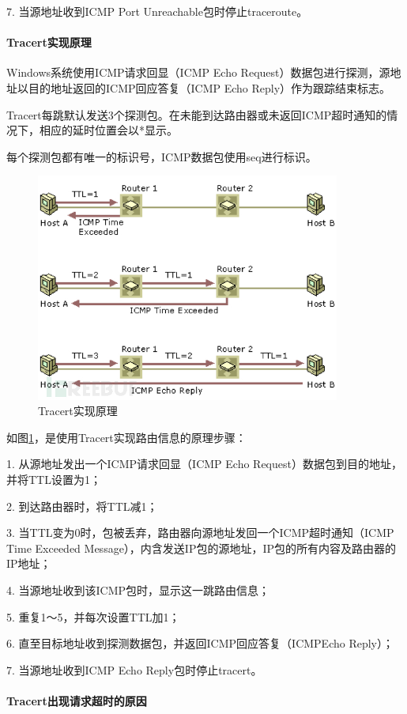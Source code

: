 \documentclass[a4paper,12pt]{report}
\begin{document}
\begin{spacing}{1.5}
7. 当源地址收到ICMP Port Unreachable包时停止traceroute。

\paragraph*{Tracert实现原理}

Windows系统使用ICMP请求回显（ICMP Echo Request）数据包进行探测，源地址以目的地址返回的ICMP回应答复（ICMP Echo Reply）作为跟踪结束标志。

Tracert每跳默认发送3个探测包。在未能到达路由器或未返回ICMP超时通知的情况下，相应的延时位置会以*显示。

每个探测包都有唯一的标识号，ICMP数据包使用seq进行标识。

\begin{figure}[htb!]
  \centering
\includegraphics[width=10cm]{figure/tracert-why.jpeg}
\caption{Tracert实现原理}
\label{pic:tracert}
\end{figure}


如图\ref{pic:tracert}，是使用Tracert实现路由信息的原理步骤：

1. 从源地址发出一个ICMP请求回显（ICMP Echo Request）数据包到目的地址，并将TTL设置为1；

2. 到达路由器时，将TTL减1；

3. 当TTL变为0时，包被丢弃，路由器向源地址发回一个ICMP超时通知（ICMP Time Exceeded Message），内含发送IP包的源地址，IP包的所有内容及路由器的IP地址；

4. 当源地址收到该ICMP包时，显示这一跳路由信息；

5. 重复1～5，并每次设置TTL加1；

6. 直至目标地址收到探测数据包，并返回ICMP回应答复（ICMPEcho Reply）；

7. 当源地址收到ICMP Echo Reply包时停止tracert。

\paragraph*{Tracert出现请求超时的原因}


\end{spacing}
\end{document}
